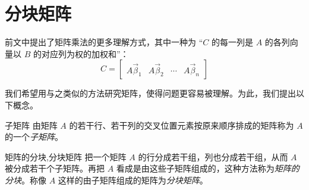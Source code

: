 
\section{分块矩阵}

前文中提出了矩阵乘法的更多理解方式，其中一种为 “$C$ 的每一列是 $A$ 的各列向量以 $B$ 的对应列为权的加权和”：
$$
C = \begin{bmatrix} A \vec \beta_1 & A \vec \beta_2 & \cdots & A \vec \beta_n \end{bmatrix}
$$

我们希望用与之类似的方法研究矩阵，使得问题更容易被理解。为此，我们提出以下概念。

\begin{definition}{子矩阵}
	由矩阵 $A$ 的若干行、若干列的交叉位置元素按原来顺序排成的矩阵称为 $A$ 的一个\emph{子矩阵}。
\end{definition}

\begin{definition}{矩阵的分块,分块矩阵}
	把一个矩阵 $A$ 的行分成若干组，列也分成若干组，从而 $A$ 被分成若干个子矩阵。再把 $A$ 看成是由这些子矩阵组成的，这种方法称为\emph{矩阵的分块}。称像 $A$ 这样的由子矩阵组成的矩阵为\emph{分块矩阵}。
\end{definition}